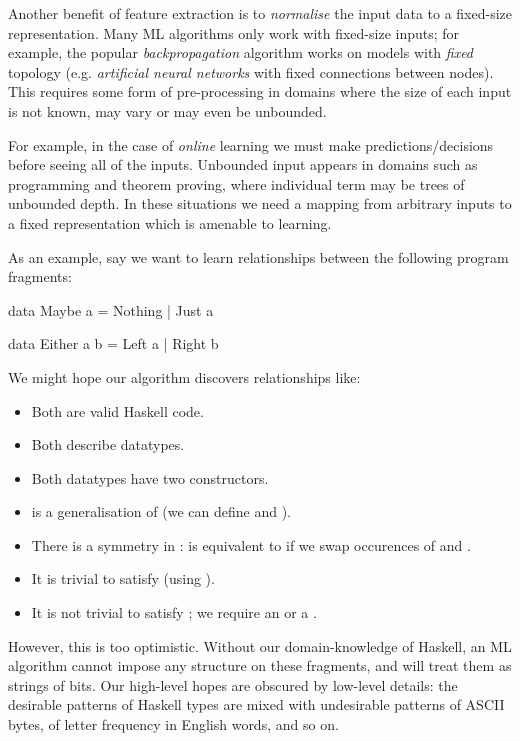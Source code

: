 Another benefit of feature extraction is to \emph{normalise} the input data to a
fixed-size representation. Many ML algorithms only work with fixed-size inputs;
for example, the popular \emph{backpropagation} \cite{Russell:2003:AIM:773294}
algorithm works on models with \emph{fixed} topology (e.g. \emph{artificial
  neural networks} with fixed connections between nodes). This requires some
form of pre-processing in domains where the size of each input is not known, may
vary or may even be unbounded.

For example, in the case of \emph{online} learning we must make
predictions/decisions before seeing all of the inputs. Unbounded input appears
in domains such as programming and theorem proving, where individual term may be
trees of unbounded depth. In these situations we need a mapping from arbitrary
inputs to a fixed representation which is amenable to learning.

As an example, say we want to learn relationships between the following program
fragments:

\begin{haskell}
data Maybe a = Nothing | Just a

data Either a b = Left a | Right b
\end{haskell}

We might hope our algorithm discovers relationships like:

\begin{itemize}
  \item Both are valid Haskell code.
  \item Both describe datatypes.
  \item Both datatypes have two constructors.
  \item {} is a generalisation of  (we can define  and ).
  \item There is a symmetry in :  is equivalent to
     if we swap occurences of  and .
  \item It is trivial to satisfy  (using ).
  \item It is not trivial to satisfy ; we require an  or a
    .
\end{itemize}

However, this is too optimistic. Without our domain-knowledge of Haskell, an ML
algorithm cannot impose any structure on these fragments, and will treat them as
strings of bits. Our high-level hopes are obscured by low-level details: the
desirable patterns of Haskell types are mixed with undesirable patterns of ASCII
bytes, of letter frequency in English words, and so on.

